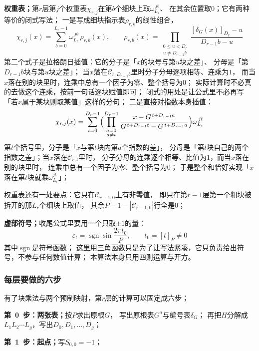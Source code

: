 \documentclass[UTF8,a4paper,11pt]{ctexart}
\begin{document}
\textbf{权重表；}第$r$层第$j$个权重表$\chi_{r,j}$在第$b$个细块上取$\omega_{L_r}^{\,jb}$、
在其余位置取$0$；它有两种等价的闭式写法；
一是写成细块指示表$\rho_{r,b}$的线性组合，
\[
 \chi_{r,j}(x)=\sum_{b=0}^{L_r-1}\omega_{L_r}^{\,jb}\,\rho_{r,b}(x),\qquad
 \rho_{r,b}(x)=\prod_{\substack{0\le u<D_r\\ u\ne D_{r-1}b}}
 \frac{[\delta_G(x)]_{D_r}-u}{D_{r-1}b-u}
\]
第二个式子是拉格朗日插值：它的分子是「$x$的块号与第$u$块之差」、
分母是「第$D_{r-1}b$块与第$u$块之差」；
当$x$落在$\mathscr{C}_{r,D_{r-1}b}$里时分子分母逐项相等、连乘为$1$，
而当$x$落在别的块里时，连乘中总有一个因子为零、整个括号为$0$；
实际计算时不必真的去做这个连乘，按前一句话逐块赋值即可；
闭式的用处是让公式里不必再写「若$x$属于某块则取某值」这样的分句；
二是直接对指数本身插值：
\[
 \chi_{r,j}(x)=\sum_{t=0}^{D_r-1}
 \Bigl(\prod_{\substack{a=0\\a\ne t}}^{D_r-1}
 \frac{x-G^{\,t+D_{r-1}a}}{G^{\,t+D_{r-1}t}-G^{\,t+D_{r-1}a}}\Bigr)\omega_{L_r}^{\,jt}
\]
第$t$个括号里，分子是「$x$与第$t$块内第$a$个指数的差」，
分母是「第$t$块自己的两个指数之差」；当$x$落在$\mathscr{C}_{r,t}$里时，
分子分母的连乘逐个相等、比值为$1$，而当$x$落在别的块里时，
连乘中总有一个因子为零、整个括号为$0$；
于是整个和恰好实现「$x$落在第$t$块就乘$\omega_{L_r}^{jt}$」；\par

权重表还有一处要点：它只在$\mathscr{C}_{r-1,0}$上有非零值，
即只在第$r-1$层第一个粗块被拆开的那$L_r$个细块上取值，
其余$P-1-|\mathscr{C}_{r-1,0}|$行全是$0$；\par

\textbf{虚部符号；}收尾公式里要用一个只取$\pm1$的量：
\[
 \varepsilon_t=\operatorname{sgn}\sin\frac{2\pi t_0}{P},\qquad t_0=[t]_P\ne0
\]
其中$\operatorname{sgn}$是符号函数；
这里用三角函数只是为了让写法紧凑，它只负责给出符号，不参与任何数值计算；
本算法本身只用四则运算与开方。\par

\subsubsection{每层要做的六步}
有了块乘法与两个预制映射，第$r$层的计算可以固定成六步；

\textbf{第~0~步：两张表；}按$P$求出原根$G$，
写出原根表$G^a$与编号表$\delta_G$；
再把$H$分解成$L_1L_2\cdots L_g$，写出$D_0,D_1,\dots,D_g$；\par

\textbf{第~1~步：起点；}写$S_{0,0}=-1$；\par
\end{document}
